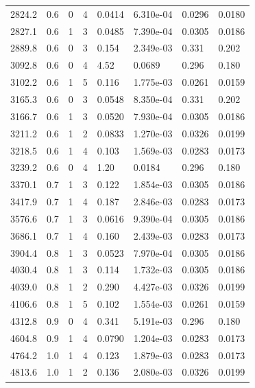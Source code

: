 \documentclass[preview]{standalone}
\begin{document}
{{{\begin{tabular}{L{1.2cm}C{1.2cm} C{0.3cm}C{0.5cm} C{1.4cm}C{1.4cm} C{1.4cm}C{1.4cm}}
  2824.2  &   0.6  & 0     &  4 &  0.0414  & 6.310e-04  & 0.0296 &  0.0180   \\ 
  2827.1  &   0.6  & 1     &  3 &  0.0485  & 7.390e-04  & 0.0305 &  0.0186   \\ 
  2889.8  &   0.6  & 0     &  3 &  0.154  & 2.349e-03  & 0.331 &  0.202   \\ 
  3092.8  &   0.6  & 0     &  4 &  4.52  & 0.0689  & 0.296 &  0.180   \\ 
  3102.2  &   0.6  & 1     &  5 &  0.116  & 1.775e-03  & 0.0261 &  0.0159   \\ 
  3165.3  &   0.6  & 0     &  3 &  0.0548  & 8.350e-04  & 0.331 &  0.202   \\ 
  3166.7  &   0.6  & 1     &  3 &  0.0520  & 7.930e-04  & 0.0305 &  0.0186   \\ 
  3211.2  &   0.6  & 1     &  2 &  0.0833  & 1.270e-03  & 0.0326 &  0.0199   \\ 
  3218.5  &   0.6  & 1     &  4 &  0.103  & 1.569e-03  & 0.0283 &  0.0173   \\ 
  3239.2  &   0.6  & 0     &  4 &  1.20  & 0.0184  & 0.296 &  0.180   \\ 
  3370.1  &   0.7  & 1     &  3 &  0.122  & 1.854e-03  & 0.0305 &  0.0186   \\ 
  3417.9  &   0.7  & 1     &  4 &  0.187  & 2.846e-03  & 0.0283 &  0.0173   \\ 
  3576.6  &   0.7  & 1     &  3 &  0.0616  & 9.390e-04  & 0.0305 &  0.0186   \\ 
  3686.1  &   0.7  & 1     &  4 &  0.160  & 2.439e-03  & 0.0283 &  0.0173   \\ 
  3904.4  &   0.8  & 1     &  3 &  0.0523  & 7.970e-04  & 0.0305 &  0.0186   \\ 
  4030.4  &   0.8  & 1     &  3 &  0.114  & 1.732e-03  & 0.0305 &  0.0186   \\ 
  4039.0  &   0.8  & 1     &  2 &  0.290  & 4.427e-03  & 0.0326 &  0.0199   \\ 
  4106.6  &   0.8  & 1     &  5 &  0.102  & 1.554e-03  & 0.0261 &  0.0159   \\ 
  4312.8  &   0.9  & 0     &  4 &  0.341  & 5.191e-03  & 0.296 &  0.180   \\ 
  4604.8  &   0.9  & 1     &  4 &  0.0790  & 1.204e-03  & 0.0283 &  0.0173   \\ 
  4764.2  &   1.0  & 1     &  4 &  0.123  & 1.879e-03  & 0.0283 &  0.0173   \\ 
  4813.6  &   1.0  & 1     &  2 &  0.136  & 2.080e-03  & 0.0326 &  0.0199   \\ 

\end{tabular}}}}
\end{document}

